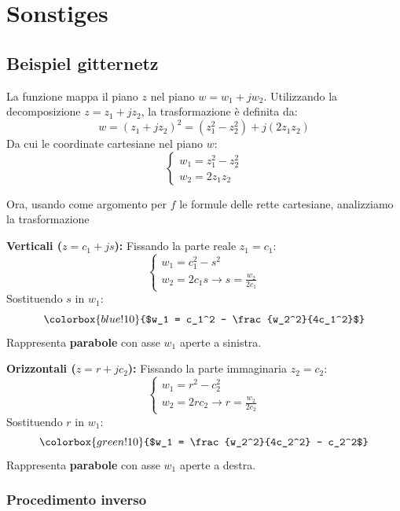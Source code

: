 \section{Sonstiges}
\subsection{Beispiel gitternetz}\label{chap:bsp_gitternetz}

La funzione mappa il piano $z$ nel piano $w = w_1 + j w_2$. Utilizzando la decomposizione $z = z_1 + j z_2$, la trasformazione è definita da:
\[ w = (z_1 + j z_2)^2 = (z_1^2 - z_2^2) + j(2 z_1 z_2) \]
Da cui le coordinate cartesiane nel piano $w$:
\[
\begin{cases}
    w_1 = z_1^2 - z_2^2 \\
    w_2 = 2 z_1 z_2
\end{cases}
\]

Ora, usando come argomento per $f$ le formule delle rette cartesiane, analizziamo la trasformazione

\begin{minipage}[t]{0.48\linewidth}
    \textbf{Verticali ($z = c_1 + js$):}
    Fissando la parte reale $z_1 = c_1$:
    \[ \begin{cases} w_1 = c_1^2 - s^2 \\ w_2 = 2c_1s \rightarrow s = \frac{w_2}{2c_1} \end{cases} \]
    Sostituendo $s$ in $w_1$:
    \[ \colorbox{blue!10}{$w_1 = c_1^2 - \frac{w_2^2}{4c_1^2}$} \]
    Rappresenta \textbf{parabole} con asse $w_1$ aperte a sinistra.
\end{minipage}
\hfill
\begin{minipage}[t]{0.48\linewidth}
    \textbf{Orizzontali ($z = r + jc_2$):}
    Fissando la parte immaginaria $z_2 = c_2$:
    \[ \begin{cases} w_1 = r^2 - c_2^2 \\ w_2 = 2rc_2 \rightarrow r = \frac{w_2}{2c_2} \end{cases} \]
    Sostituendo $r$ in $w_1$:
    \[ \colorbox{green!10}{$w_1 = \frac{w_2^2}{4c_2^2} - c_2^2$} \]
    Rappresenta \textbf{parabole} con asse $w_1$ aperte a destra.
\end{minipage}

\vspace{1.5em}

\subsubsection{Procedimento inverso}
